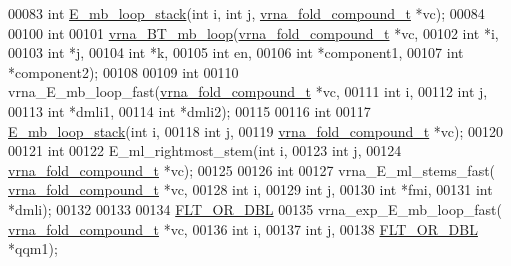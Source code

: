 \begin{DoxyCode}
00083 \textcolor{keywordtype}{int} \hyperlink{multibranch__loops_8h_a81d73d23f480f84df8cfd0042c032503}{E\_mb\_loop\_stack}(\textcolor{keywordtype}{int} i, \textcolor{keywordtype}{int} j, \hyperlink{group__fold__compound_structvrna__fc__s}{vrna\_fold\_compound\_t} *vc);
00084 
00100 \textcolor{keywordtype}{int}
00101 \hyperlink{multibranch__loops_8h_a9cb520ddfd8b3a48089a7910b045d06b}{vrna\_BT\_mb\_loop}(\hyperlink{group__fold__compound_structvrna__fc__s}{vrna\_fold\_compound\_t} *vc,
00102                 \textcolor{keywordtype}{int} *i,
00103                 \textcolor{keywordtype}{int} *j,
00104                 \textcolor{keywordtype}{int} *k,
00105                 \textcolor{keywordtype}{int} en,
00106                 \textcolor{keywordtype}{int} *component1,
00107                 \textcolor{keywordtype}{int} *component2);
00108 
00109 \textcolor{keywordtype}{int}
00110 vrna\_E\_mb\_loop\_fast(\hyperlink{group__fold__compound_structvrna__fc__s}{vrna\_fold\_compound\_t} *vc,
00111                     \textcolor{keywordtype}{int} i,
00112                     \textcolor{keywordtype}{int} j,
00113                     \textcolor{keywordtype}{int} *dmli1,
00114                     \textcolor{keywordtype}{int} *dmli2);
00115 
00116 \textcolor{keywordtype}{int}
00117 \hyperlink{multibranch__loops_8h_a81d73d23f480f84df8cfd0042c032503}{E\_mb\_loop\_stack}(\textcolor{keywordtype}{int} i,
00118                 \textcolor{keywordtype}{int} j,
00119                 \hyperlink{group__fold__compound_structvrna__fc__s}{vrna\_fold\_compound\_t} *vc);
00120 
00121 \textcolor{keywordtype}{int}
00122 E\_ml\_rightmost\_stem(\textcolor{keywordtype}{int} i,
00123                     \textcolor{keywordtype}{int} j,
00124                     \hyperlink{group__fold__compound_structvrna__fc__s}{vrna\_fold\_compound\_t} *vc);
00125 
00126 \textcolor{keywordtype}{int}
00127 vrna\_E\_ml\_stems\_fast( \hyperlink{group__fold__compound_structvrna__fc__s}{vrna\_fold\_compound\_t} *vc,
00128                       \textcolor{keywordtype}{int} i,
00129                       \textcolor{keywordtype}{int} j,
00130                       \textcolor{keywordtype}{int} *fmi,
00131                       \textcolor{keywordtype}{int} *dmli);
00132 
00133 
00134 \hyperlink{group__data__structures_ga31125aeace516926bf7f251f759b6126}{FLT\_OR\_DBL}
00135 vrna\_exp\_E\_mb\_loop\_fast( \hyperlink{group__fold__compound_structvrna__fc__s}{vrna\_fold\_compound\_t} *vc,
00136                     \textcolor{keywordtype}{int} i,
00137                     \textcolor{keywordtype}{int} j,
00138                     \hyperlink{group__data__structures_ga31125aeace516926bf7f251f759b6126}{FLT\_OR\_DBL} *qqm1);

\end{DoxyCode}
